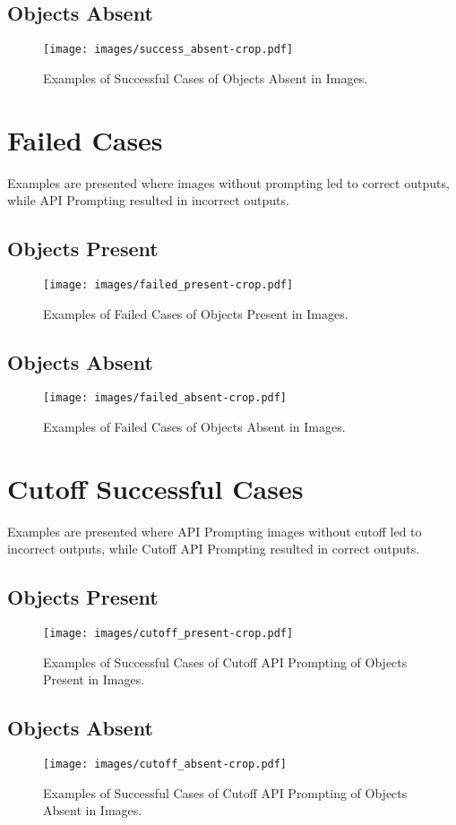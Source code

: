 \newpage
\subsection{Objects Absent}
\begin{figure}[h!]
    \centering
    \texttt{[image: images/success\_absent-crop.pdf]}
    \caption{Examples of Successful Cases of Objects Absent in Images.}
\end{figure}

\clearpage

\section{Failed Cases}
Examples are presented where images without prompting led to correct outputs, while API Prompting resulted in incorrect outputs.

\subsection{Objects Present}
\begin{figure}[h!]
    \centering
    \texttt{[image: images/failed\_present-crop.pdf]}
    \caption{Examples of Failed Cases of Objects Present in Images.}
\end{figure}

\clearpage
\subsection{Objects Absent}

\begin{figure}[h!]
    \centering
    \texttt{[image: images/failed\_absent-crop.pdf]}
    \caption{Examples of Failed Cases of Objects Absent in Images.}
\end{figure}
\newpage

\section{Cutoff Successful Cases}
Examples are presented where API Prompting images without cutoff led to incorrect outputs, while Cutoff API Prompting resulted in correct outputs.

\subsection{Objects Present}
\begin{figure}[h!]
    \centering
    \texttt{[image: images/cutoff\_present-crop.pdf]}
    \caption{Examples of Successful Cases of Cutoff API Prompting of Objects Present in Images.}
\end{figure}

\clearpage
\subsection{Objects Absent}
\begin{figure}[h!]
    \centering
    \texttt{[image: images/cutoff\_absent-crop.pdf]}
    \caption{Examples of Successful Cases of Cutoff API Prompting of Objects Absent in Images.}
\end{figure}
